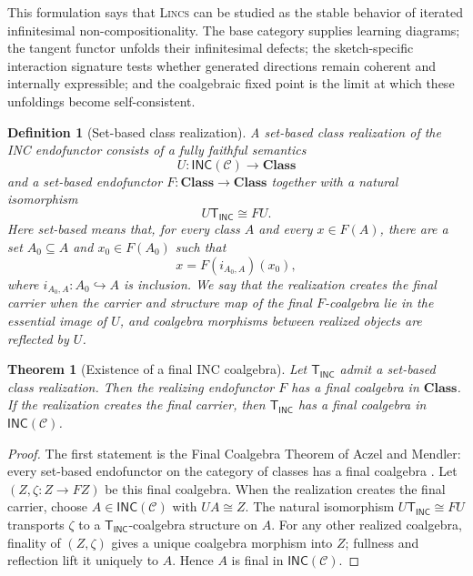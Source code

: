 \documentclass{article}
\newtheorem{definition}{Definition}
\newtheorem{theorem}{Theorem}
\newcommand{\C}{\mathcal{C}}
\newcommand{\T}{\mathsf{T}}
\newcommand{\INC}{\mathsf{INC}}
\begin{document}
This formulation says that \textsc{Lincs}   can be studied as the stable behavior of iterated infinitesimal non-compositionality. The base category supplies learning diagrams; the tangent functor unfolds their infinitesimal defects; the sketch-specific interaction signature tests whether generated directions remain coherent and internally expressible; and the coalgebraic fixed point is the limit at which these unfoldings become self-consistent.

\begin{definition}[Set-based class realization]
A set-based class realization of the INC endofunctor consists of a fully
faithful semantics
\[
U:\mathsf{INC}(\C)\longrightarrow\mathbf{Class}
\]
and a set-based endofunctor \(F:\mathbf{Class}\to\mathbf{Class}\) together
with a natural isomorphism
\[
U\T_{\INC}\cong FU.
\]
Here set-based means that, for every class \(A\) and every \(x\in F(A)\),
there are a set \(A_0\subseteq A\) and \(x_0\in F(A_0)\) such that
\[
x=F(i_{A_0,A})(x_0),
\]
where \(i_{A_0,A}:A_0\hookrightarrow A\) is inclusion.  We say that the
realization \emph{creates the final carrier} when the carrier and structure
map of the final \(F\)-coalgebra lie in the essential image of \(U\), and
coalgebra morphisms between realized objects are reflected by \(U\).
\end{definition}

\begin{theorem}[Existence of a final INC coalgebra]
Let \(\T_{\INC}\) admit a set-based class realization.  Then the realizing
endofunctor \(F\) has a final coalgebra in \(\mathbf{Class}\).  If the
realization creates the final carrier, then \(\T_{\INC}\) has a final
coalgebra in \(\mathsf{INC}(\C)\).
\end{theorem}

\begin{proof}
The first statement is the Final Coalgebra Theorem of Aczel and Mendler:
every set-based endofunctor on the category of classes has a final coalgebra
\citep{aczel1989final}.  Let \((Z,\zeta:Z\to FZ)\) be this final coalgebra.
When the realization creates the final carrier, choose
\(A\in\mathsf{INC}(\C)\) with \(UA\cong Z\).  The natural isomorphism
\(U\T_{\INC}\cong FU\) transports \(\zeta\) to a
\(\T_{\INC}\)-coalgebra structure on \(A\).  For any other realized
coalgebra, finality of \((Z,\zeta)\) gives a unique coalgebra morphism into
\(Z\); fullness and reflection lift it uniquely to \(A\).  Hence \(A\) is
final in \(\mathsf{INC}(\C)\).\qedhere
\end{proof}
\end{document}
